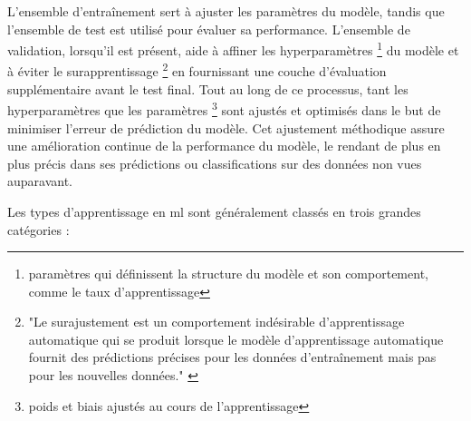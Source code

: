 L'ensemble d'entraînement sert à ajuster les paramètres du modèle, tandis que l'ensemble de test est utilisé pour évaluer sa performance. L'ensemble de validation, lorsqu'il est présent, aide à affiner les hyperparamètres \footnote{paramètres qui définissent la structure du modèle et son comportement, comme le taux d'apprentissage} du modèle et à éviter le surapprentissage \footnote{"Le surajustement est un comportement indésirable d'apprentissage automatique qui se produit lorsque le modèle d'apprentissage automatique fournit des prédictions précises pour les données d'entraînement mais pas pour les nouvelles données." \cite{overfitting}} en fournissant une couche d'évaluation supplémentaire avant le test final. Tout au long de ce processus, tant les hyperparamètres que les paramètres \footnote{poids et biais ajustés au cours de l'apprentissage} sont ajustés et optimisés dans le but de minimiser l'erreur de prédiction du modèle. Cet ajustement méthodique assure une amélioration continue de la performance du modèle, le rendant de plus en plus précis dans ses prédictions ou classifications sur des données non vues auparavant.


Les types d'apprentissage en \ac{ml} sont généralement classés en trois grandes catégories :

